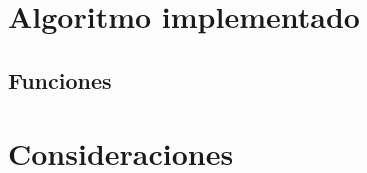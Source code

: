 \documentclass{article}
\begin{document}
\section{Algoritmo implementado}
\label{implementado}
    \begin{flushleft}
    
    \subsection{Funciones}
    \begin{flushleft}
    
    \vspace*{0.3cm}
        
    \end{flushleft}
    \end{flushleft}
    
    \vspace*{0.1cm}
    
\section{Consideraciones}
\label{problemas}
    \begin{flushleft}
        
    \end{flushleft}
    \vspace*{2cm}
\newpage    
    

\vfill
\vspace*{0.5cm}

\end{document}

